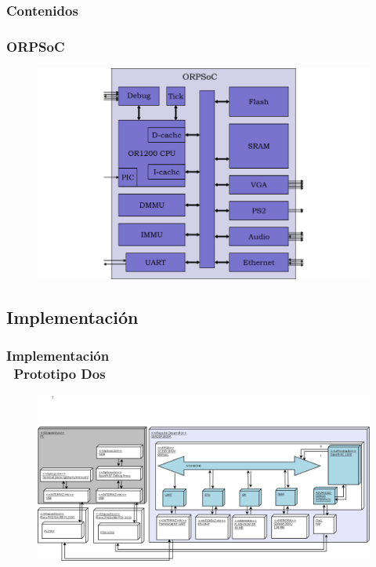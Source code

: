 \documentclass[xcolor=dvipsnames,mathserif,9pt]{beamer}
\begin{document}
 \begin{frame}
    \frametitle{Contenidos}
    \tableofcontents[currentsection]
  \end{frame}


\begin{frame} \frametitle{ORPSoC}%
\begin{figure}[!h]
      \centering
     \includegraphics[scale=0.3]{figuras/orpsoc}
    \end{figure}
\end{frame}


\subsection{Implementación}
\begin{frame} \frametitle{Implementación\\ \ Prototipo Dos}
 \begin{figure}[!h]
      \centering
     \includegraphics[scale=0.09]{figuras/proto2}
    \end{figure}
\end{frame}
\end{document}
